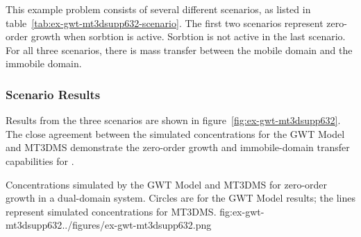 This example problem consists of several different scenarios, as listed in table~\ref{tab:ex-gwt-mt3dsupp632-scenario}.  The first two scenarios represent zero-order growth when sorbtion is active.  Sorbtion is not active in the last scenario.  For all three scenarios, there is mass transfer between the mobile domain and the immobile domain.




\subsubsection{Scenario Results}

Results from the three scenarios are shown in figure~\ref{fig:ex-gwt-mt3dsupp632}.  The close agreement between the simulated concentrations for the \mf GWT Model and MT3DMS demonstrate the zero-order growth and immobile-domain transfer capabilities for \mf.

\begin{StandardFigure}{
                                     Concentrations simulated by the \mf GWT Model and MT3DMS for zero-order growth in a dual-domain system.  Circles are for the GWT Model results; the lines represent simulated concentrations for MT3DMS.
                                     }{fig:ex-gwt-mt3dsupp632}{../figures/ex-gwt-mt3dsupp632.png}
\end{StandardFigure}                                 

